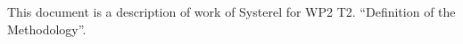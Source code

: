 
This document is a description of work of Systerel for WP2 T2. ``Definition of
the Methodology''.

